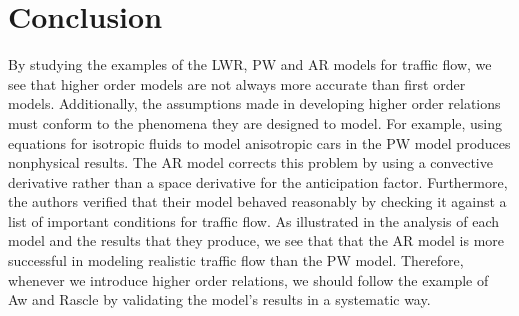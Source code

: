 \documentclass{article}
\begin{document}
\section{Conclusion}
By studying the examples of the LWR, PW and AR models for traffic flow, we see that higher order models are not always more accurate than first order models.  Additionally, the assumptions made in developing higher order relations must conform to the phenomena they are designed to model.  For example, using equations for isotropic fluids to model anisotropic cars in the PW model produces nonphysical results.  The AR model corrects this problem by using a convective derivative rather than a space derivative for the anticipation factor.  Furthermore, the authors verified that their model behaved reasonably by checking it against a list of important conditions for traffic flow.  As illustrated in the analysis of each model and the results that they produce, we see that that the AR model is more successful in modeling realistic traffic flow than the PW model. Therefore, whenever we introduce higher order relations, we should follow the example of Aw and Rascle by validating the model's results in a systematic way.  

{}

\end{document}
